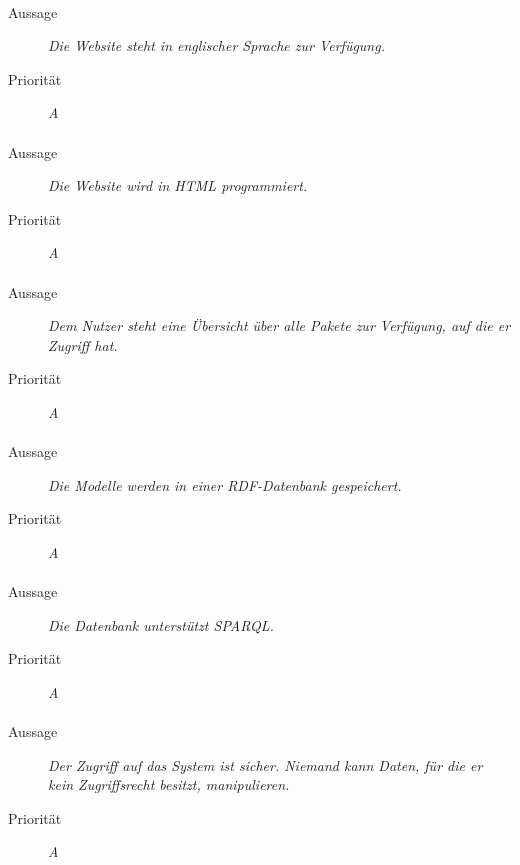 \paragraph{}
\begin{description}
\item[Aussage] \textit{Die Website steht in englischer Sprache zur Verfügung.}
\item[Priorität] \textit{A}
\end{description}

\paragraph{}
\begin{description}
\item[Aussage] \textit{Die Website wird in HTML programmiert.}
\item[Priorität] \textit{A}
\end{description}

\paragraph{}
\begin{description}
\item[Aussage] \textit{Dem Nutzer steht eine Übersicht über alle Pakete zur Verfügung, auf die er Zugriff hat.}
\item[Priorität] \textit{A}
\end{description}

\paragraph{}
\begin{description}
\item [Aussage] \textit{Die Modelle werden in einer RDF-Datenbank gespeichert.}
\item [Priorität] \textit{A}
\end{description}

\paragraph{}
\begin{description}
\item[Aussage] \textit{Die Datenbank unterstützt SPARQL.}
\item[Priorität] \textit{A}
\end{description}

\paragraph{}
\begin{description}
\item[Aussage] \textit{Der Zugriff auf das System ist sicher. Niemand kann Daten, für die er kein Zugriffsrecht besitzt, manipulieren.}
\item[Priorität] \textit{A}
\end{description}

